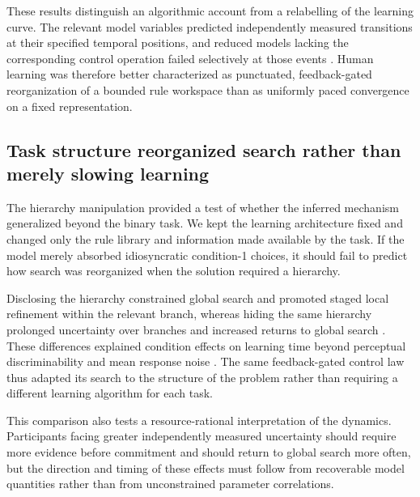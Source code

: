 These results distinguish an algorithmic account from a relabelling of the
learning curve. The relevant model variables predicted independently measured
transitions at their specified temporal positions, and reduced models lacking
the corresponding control operation failed selectively at those events
. Human learning was therefore
better characterized as punctuated, feedback-gated reorganization of a bounded
rule workspace than as uniformly paced convergence on a fixed representation.


\subsection{Task structure reorganized search rather than merely slowing learning}

The hierarchy manipulation provided a test of whether the inferred mechanism
generalized beyond the binary task. We kept the learning architecture fixed and
changed only the rule library and information made available by the task. If
the model merely absorbed idiosyncratic condition-1 choices, it should fail to
predict how search was reorganized when the solution required a hierarchy.

Disclosing the hierarchy constrained global search and promoted staged local
refinement within the relevant branch, whereas hiding the same hierarchy
prolonged uncertainty over branches and increased returns to global search
. These differences
explained condition effects on learning time beyond perceptual discriminability
and mean response noise . The same
feedback-gated control law thus adapted its search to the structure of the
problem rather than requiring a different learning algorithm for each task.

This comparison also tests a resource-rational interpretation of the dynamics.
Participants facing greater independently measured uncertainty should require
more evidence before commitment and should return to global search more often,
but the direction and timing of these effects must follow from recoverable
model quantities rather than from unconstrained parameter correlations.


